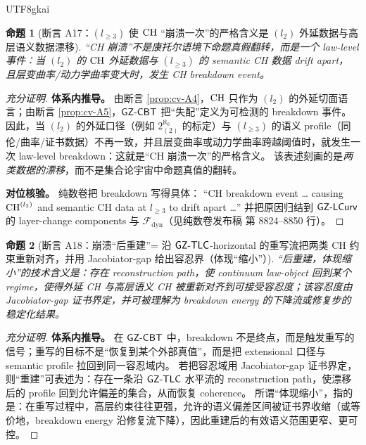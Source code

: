 \documentclass[12pt]{article}
\newtheorem{proposition}{命题}[section]
\begin{document}
\begin{CJK*}{UTF8}{gkai}
\begin{proposition}[断言 A17：$(l_{\ge3})$ 使 $\mathrm{CH}$ “崩溃一次”的严格含义是 $(l_2)$ 外延数据与高层语义数据漂移]\label{prop:cv-A17}
“CH 崩溃”不是康托尔语境下命题真假翻转，而是一个 law-level 事件：当 $(l_2)$ 的 $\mathrm{CH}$ 外延数据与 $(l_{\ge3})$ 的 semantic CH 数据 drift apart，
  且层变曲率/动力学曲率变大时，发生 CH breakdown event。
\end{proposition}

\begin{proof}[充分证明]
\textbf{体系内推导。}
由断言 \ref{prop:cv-A4}，$\mathrm{CH}$ 只作为 $(l_2)$ 的外延切面语言；由断言 \ref{prop:cv-A5}，$\mathsf{GZ\text{-}CBT}$ 把“失配”定义为可检测的 breakdown 事件。
因此，当 $(l_2)$ 的外延口径（例如 $2^{\aleph_0}_{(2)}$ 的标定）与 $(l_{\ge3})$ 的语义 profile（同伦/曲率/证书数据）不再一致，并且层变曲率或动力学曲率跨越阈值时，就发生一次
  law-level breakdown：这就是“CH 崩溃一次”的严格含义。
该表述刻画的是\emph{两类数据的漂移}，而不是集合论宇宙中命题真值的翻转。

\textbf{对位核验。}
纯数卷把 breakdown 写得具体： “CH breakdown event … causing $\mathrm{CH}^{(l_2)}$ and semantic CH data at $l_{\ge3}$ to drift apart
  …” 并把原因归结到 $\mathsf{GZ\text{-}LCurv}$ 的 layer-change components 与 $\mathcal F_{\mathrm{dyn}}$（见纯数卷发布稿\cite{GaoZheng2025GFramework} 第
  8824--8850 行）。
\end{proof}

\begin{proposition}[断言 A18：崩溃“后重建”= 沿 $\mathsf{GZ\text{-}TLC}$-horizontal 的重写流把两类 CH 约束重新对齐，并用 Jacobiator-gap 给出容忍界（体现“缩小”）]\label{prop:cv-A18}
“后重建，体现缩小”的技术含义是：存在 reconstruction path，使 continuum law-object 回到某个 regime，使得外延 CH 与高层语义 CH 被重新对齐到可接受容忍度；该容忍度由
  Jacobiator-gap 证书界定，并可被理解为 breakdown energy 的下降流或修复步的稳定化结果。
\end{proposition}

\begin{proof}[充分证明]
\textbf{体系内推导。}
在 $\mathsf{GZ\text{-}CBT}$ 中，breakdown 不是终点，而是触发重写的信号；重写的目标不是“恢复到某个外部真值”，而是把 extensional 口径与 semantic profile 拉回到同一容忍域内。
若把容忍域用 Jacobiator-gap 证书界定，则“重建”可表述为：存在一条沿 $\mathsf{GZ\text{-}TLC}$ 水平流的 reconstruction path，使漂移后的 profile 回到允许偏差的集合，从而恢复 coherence。
所谓“体现缩小”，指的是：在重写过程中，高层约束往往更强，允许的语义偏差区间被证书界收缩（或等价地，breakdown energy 沿修复流下降），因此重建后的有效语义范围更窄、更可控。


\end{proof}
\end{CJK*}
\end{document}
